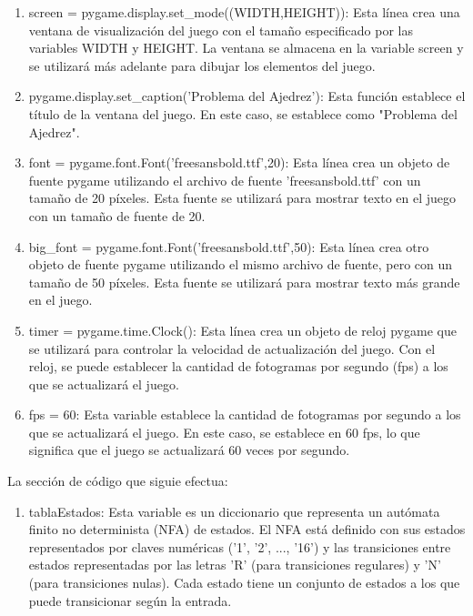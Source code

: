 \begin{enumerate}
\begin{enumerate}
    \item screen = pygame.display.set\_mode((WIDTH,HEIGHT)): Esta línea crea una ventana de visualización del juego con el tamaño especificado por las variables WIDTH y HEIGHT. La ventana se almacena en la variable screen y se utilizará más adelante para dibujar los elementos del juego.\newline
    
    \item pygame.display.set\_caption('Problema del Ajedrez'): Esta función establece el título de la ventana del juego. En este caso, se establece como "Problema del Ajedrez".\newline
    
    \item font = pygame.font.Font('freesansbold.ttf',20): Esta línea crea un objeto de fuente pygame utilizando el archivo de fuente 'freesansbold.ttf' con un tamaño de 20 píxeles. Esta fuente se utilizará para mostrar texto en el juego con un tamaño de fuente de 20.\newline
    
    \item big\_font = pygame.font.Font('freesansbold.ttf',50): Esta línea crea otro objeto de fuente pygame utilizando el mismo archivo de fuente, pero con un tamaño de 50 píxeles. Esta fuente se utilizará para mostrar texto más grande en el juego.\newline
    
    \item timer = pygame.time.Clock(): Esta línea crea un objeto de reloj pygame que se utilizará para controlar la velocidad de actualización del juego. Con el reloj, se puede establecer la cantidad de fotogramas por segundo (fps) a los que se actualizará el juego.\newline
    
    \item fps = 60: Esta variable establece la cantidad de fotogramas por segundo a los que se actualizará el juego. En este caso, se establece en 60 fps, lo que significa que el juego se actualizará 60 veces por segundo.\newline
\end{enumerate}

La sección de código que siguie efectua:
\begin{enumerate}
    \item tablaEstados: Esta variable es un diccionario que representa un autómata finito no determinista (NFA) de estados. El NFA está definido con sus estados representados por claves numéricas ('1', '2', ..., '16') y las transiciones entre estados representadas por las letras 'R' (para transiciones regulares) y 'N' (para transiciones nulas). Cada estado tiene un conjunto de estados a los que puede transicionar según la entrada.\newline


\end{enumerate}
\end{enumerate}
